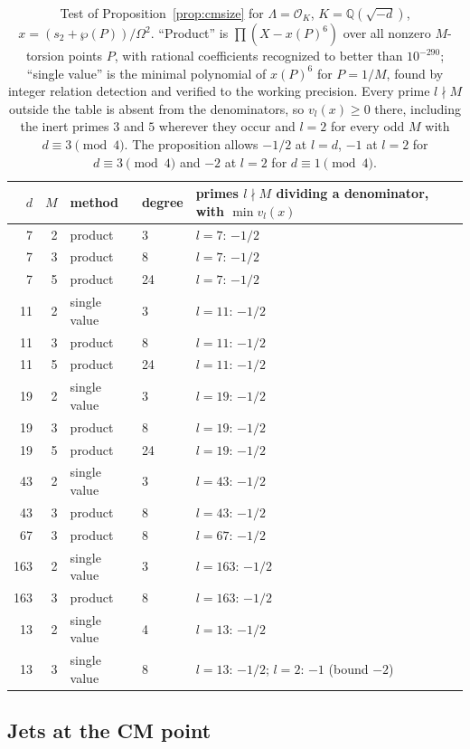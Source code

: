 \documentclass[11pt]{article}
\theoremstyle{remark}
\begin{document}
\begin{table}[ht]
\centering\small
\begin{tabular}{rrllp{6.2cm}}
\toprule
$d$ & $M$ & method & degree & primes $l\nmid M$ dividing a denominator, with $\min v_l(x)$\\
\midrule
7 & 2 & product & 3 & $l=7$: $-1/2$\\
7 & 3 & product & 8 & $l=7$: $-1/2$\\
7 & 5 & product & 24 & $l=7$: $-1/2$\\
11 & 2 & single value & 3 & $l=11$: $-1/2$\\
11 & 3 & product & 8 & $l=11$: $-1/2$\\
11 & 5 & product & 24 & $l=11$: $-1/2$\\
19 & 2 & single value & 3 & $l=19$: $-1/2$\\
19 & 3 & product & 8 & $l=19$: $-1/2$\\
19 & 5 & product & 24 & $l=19$: $-1/2$\\
43 & 2 & single value & 3 & $l=43$: $-1/2$\\
43 & 3 & product & 8 & $l=43$: $-1/2$\\
67 & 3 & product & 8 & $l=67$: $-1/2$\\
163 & 2 & single value & 3 & $l=163$: $-1/2$\\
163 & 3 & product & 8 & $l=163$: $-1/2$\\
13 & 2 & single value & 4 & $l=13$: $-1/2$\\
13 & 3 & single value & 8 & $l=13$: $-1/2$; $l=2$: $-1$ (bound $-2$)\\
\bottomrule
\end{tabular}
\caption{Test of Proposition~\ref{prop:cmsize} for $\Lambda=\mathcal O_K$, $K=\mathbb Q(\sqrt{-d})$, $x=(s_2+\wp(P))/\Omega^2$. ``Product'' is $\prod(X-x(P)^6)$ over all nonzero $M$-torsion points $P$, with rational coefficients recognized to better than $10^{-290}$; ``single value'' is the minimal polynomial of $x(P)^6$ for $P=1/M$, found by integer relation detection and verified to the working precision. Every prime $l\nmid M$ outside the table is absent from the denominators, so $v_l(x)\ge0$ there, including the inert primes $3$ and $5$ wherever they occur and $l=2$ for every odd $M$ with $d\equiv3\pmod4$. The proposition allows $-1/2$ at $l=d$, $-1$ at $l=2$ for $d\equiv3\pmod4$ and $-2$ at $l=2$ for $d\equiv1\pmod4$.}\label{tab:cm}
\end{table}

\subsection{Jets at the CM point}
\end{document}
